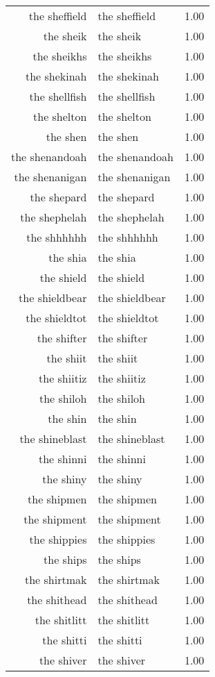 \begin{table}[ht]
\begin{tabular}{rlr}
  the sheffield & the sheffield & 1.00 \\ 
  the sheik & the sheik & 1.00 \\ 
  the sheikhs & the sheikhs & 1.00 \\ 
  the shekinah & the shekinah & 1.00 \\ 
  the shellfish & the shellfish & 1.00 \\ 
  the shelton & the shelton & 1.00 \\ 
  the shen & the shen & 1.00 \\ 
  the shenandoah & the shenandoah & 1.00 \\ 
  the shenanigan & the shenanigan & 1.00 \\ 
  the shepard & the shepard & 1.00 \\ 
  the shephelah & the shephelah & 1.00 \\ 
  the shhhhhh & the shhhhhh & 1.00 \\ 
  the shia & the shia & 1.00 \\ 
  the shield & the shield & 1.00 \\ 
  the shieldbear & the shieldbear & 1.00 \\ 
  the shieldtot & the shieldtot & 1.00 \\ 
  the shifter & the shifter & 1.00 \\ 
  the shiit & the shiit & 1.00 \\ 
  the shiitiz & the shiitiz & 1.00 \\ 
  the shiloh & the shiloh & 1.00 \\ 
  the shin & the shin & 1.00 \\ 
  the shineblast & the shineblast & 1.00 \\ 
  the shinni & the shinni & 1.00 \\ 
  the shiny & the shiny & 1.00 \\ 
  the shipmen & the shipmen & 1.00 \\ 
  the shipment & the shipment & 1.00 \\ 
  the shippies & the shippies & 1.00 \\ 
  the ships & the ships & 1.00 \\ 
  the shirtmak & the shirtmak & 1.00 \\ 
  the shithead & the shithead & 1.00 \\ 
  the shitlitt & the shitlitt & 1.00 \\ 
  the shitti & the shitti & 1.00 \\ 
  the shiver & the shiver & 1.00 \\ 

\end{tabular}
\end{table}
